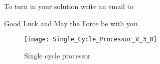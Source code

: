\documentclass[a4paper,12pt]{article}
\begin{document}
To turn in your solution write an email to %

\vspace{0.7cm}
Good Luck and May the Force be with you.

\begin{landscape}
\begin{figure}[!h]
\vspace{-0.5cm}
\hspace{-1.8cm}
\texttt{[image: Single\_Cycle\_Processor\_V\_3\_0]}
\caption{Single cycle processor}
\label{fig:SingleCycleProcessor}
\end{figure}
\end{landscape}
\end{document}
